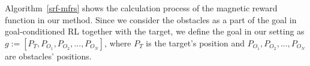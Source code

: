 \documentclass[journal]{IEEEtran}
\begin{document}
Algorithm~\ref{srf-mfrs} shows the calculation process of the magnetic reward function in our method.
Since we consider the obstacles as a part of the goal in goal-conditioned RL together with the target, we define the goal in our setting as $g := [P_T,P_{O_1},P_{O_2},...,P_{O_N}]$, where $P_T$ is the target's position and $P_{O_1}, P_{O_2},...,P_{O_N}$ are obstacles' positions.
\end{document}
